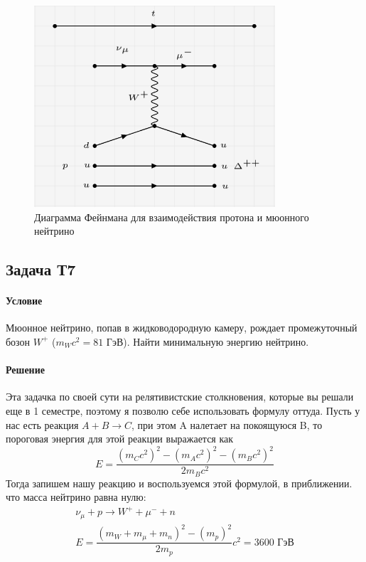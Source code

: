 \documentclass[12pt]{article}
\begin{document}
\begin{figure}[h]
    \centering
    \includegraphics[width=0.8\textwidth,height=\textheight,keepaspectratio]{Seminar_11/pics/pic_06_task_10_73.PNG}
    \caption{Диаграмма Фейнмана для взаимодействия протона и мюонного нейтрино}
    \label{fig:sem_11_10_73}
\end{figure}


\subsection{Задача Т7}
\label{task_}
\paragraph{Условие}
Мюонное нейтрино, попав в жидководородную камеру, рождает промежуточный бозон $W^+$ ($m_Wc^2 = 81$ ГэВ). Найти минимальную энергию нейтрино.
\paragraph{Решение}
Эта задачка по своей сути на релятивистские столкновения, которые вы решали еще в 1 семестре, поэтому я позволю себе использовать формулу оттуда. Пусть у нас есть реакция $A + B \rightarrow C$, при этом A налетает на покоящуюся B, то пороговая энергия для этой реакции выражается как 
\begin{equation*}
    E=\dfrac{(m_Cc^2)^2 - (m_Ac^2)^2 - (m_Bc^2)^2}{2m_Bc^2}
\end{equation*}
Тогда запишем нашу реакцию и воспользуемся этой формулой, в приближении. что масса нейтрино равна нулю:
\begin{gather*}
    \nu_{\mu} + p \rightarrow W^+ + \mu^- + n\\
    E = \dfrac{(m_W + m_{\mu} + m_n)^2 - (m_p)^2}{2m_p} c^2 = 3600 \text{ ГэВ}
\end{gather*}
\end{document}
